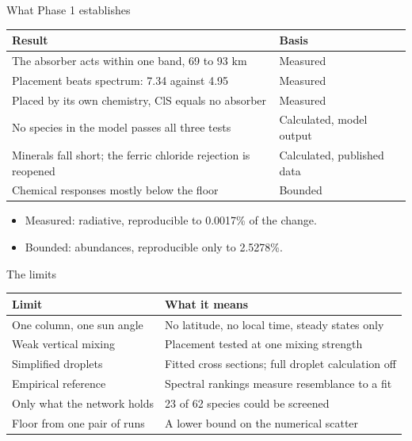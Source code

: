 \documentclass[aspectratio=169,10pt,t,usepdftitle=false]{beamer}
\begin{document}
\begin{frame}{What Phase 1 establishes}
  \vskip2mm
  \centering
  \small
  \renewcommand{\arraystretch}{1.35}
  \begin{tabular}{@{}L{0.62\textwidth}l@{}}
    \toprule
    \textbf{Result} & \textbf{Basis}\\
    \midrule
    The absorber acts within one band, 69 to 93 km & Measured\\
    Placement beats spectrum: 7.34 against 4.95 & Measured\\
    Placed by its own chemistry, ClS equals no absorber & Measured\\
    No species in the model passes all three tests & Calculated, model output\\
    Minerals fall short; the ferric chloride rejection is reopened & Calculated, published data\\
    Chemical responses mostly below the floor & Bounded\\
    \bottomrule
  \end{tabular}
  \vskip5mm
  \raggedright
  \begin{itemize}
    \item Measured: radiative, reproducible to 0.0017\% of the change.
    \item Bounded: abundances, reproducible only to 2.5278\%.
  \end{itemize}
\end{frame}

\begin{frame}{The limits}
  \vskip2mm
  \centering
  \small
  \renewcommand{\arraystretch}{1.35}
  \begin{tabular}{@{}L{0.36\textwidth}L{0.56\textwidth}@{}}
    \toprule
    \textbf{Limit} & \textbf{What it means}\\
    \midrule
    One column, one sun angle & No latitude, no local time, steady states only\\
    Weak vertical mixing      & Placement tested at one mixing strength\\
    Simplified droplets       & Fitted cross sections; full droplet calculation off\\
    Empirical reference       & Spectral rankings measure resemblance to a fit\\
    Only what the network holds & 23 of 62 species could be screened\\
    Floor from one pair of runs & A lower bound on the numerical scatter\\
    \bottomrule
  \end{tabular}
  \vskip5mm
  \raggedright
\end{frame}
\end{document}

